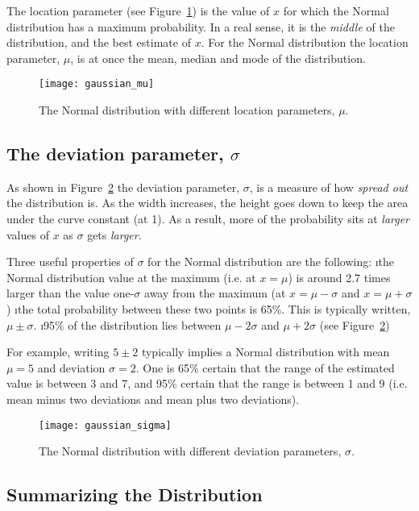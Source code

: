 The location parameter (see Figure~\ref{fig:gaussian_mu}) is the value of $x$ for which the Normal distribution has a maximum probability.  In a real sense, it is the {\em middle} of the distribution, and the best estimate of $x$.  For the Normal distribution the location parameter, $\mu$, is at once the mean, median and mode of the distribution.

\begin{figure}
\texttt{[image: gaussian\_mu]}
\caption{The Normal distribution with different location parameters, $\mu$.}
\label{fig:gaussian_mu}
\end{figure}

\subsection{The deviation parameter, $\sigma$}

As shown in Figure~\ref{fig:gaussian_sigma} the deviation parameter, $\sigma$, is a measure of how {\em spread out} the distribution is.  As the width increases, the height goes down to keep the area under the curve constant (at 1).  As a result, more of the probability sits at \emph{larger} values of $x$ as $\sigma$ gets \emph{larger}.

Three useful properties of $\sigma$ for the Normal distribution are the following:
\be
\i the Normal distribution value at the maximum (i.e. at $x=\mu$) is around 2.7 times larger than the value one-$\sigma$ away from the maximum (at $x=\mu-\sigma$ and $x=\mu+\sigma$)
\i the total probability between these two points is 65\%.  This is typically written, $\mu\pm\sigma$. 
\i 95\% of the distribution lies between $\mu-2\sigma$ and $\mu+2\sigma$ (see Figure~\ref{fig:gaussian_sigma})
\ee

 For example, writing $5\pm 2$ typically implies a Normal distribution with mean $\mu=5$ and deviation $\sigma=2$.  One is 65\% certain that the range of the estimated value is between 3 and 7, and 95\% certain that the range is between 1 and 9 (i.e. mean minus two deviations and mean plus two deviations). 


\begin{figure}
\texttt{[image: gaussian\_sigma]}
\caption{The Normal distribution with different deviation parameters, $\sigma$.}
\label{fig:gaussian_sigma}
\end{figure}

\subsection{Summarizing the Distribution}

